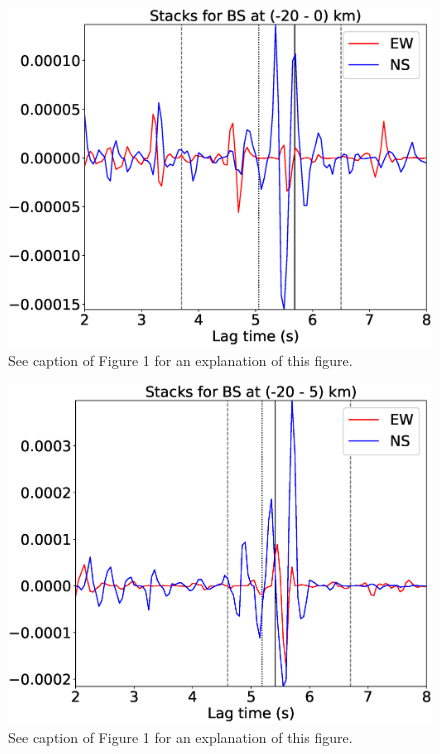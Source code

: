 \documentclass[letterpaper, 12pt]{article}
\begin{document}
\begin{figure}[H]
\includegraphics[width=\linewidth]{figures/intervals/BS_-20_000_stacks.eps}
\caption{See caption of Figure 1 for an explanation of this figure.}
\end{figure}

\begin{figure}[H]
\includegraphics[width=\linewidth]{figures/intervals/BS_-20_005_stacks.eps}
\caption{See caption of Figure 1 for an explanation of this figure.}
\end{figure}
\end{document}
